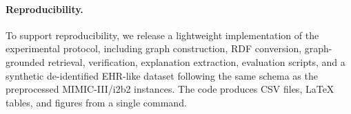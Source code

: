 \paragraph{Reproducibility.}
To support reproducibility, we release a lightweight implementation of the experimental protocol, including graph construction, RDF conversion, graph-grounded retrieval, verification, explanation extraction, evaluation scripts, and a synthetic de-identified EHR-like dataset following the same schema as the preprocessed MIMIC-III/i2b2 instances. The code produces CSV files, LaTeX tables, and figures from a single command.
